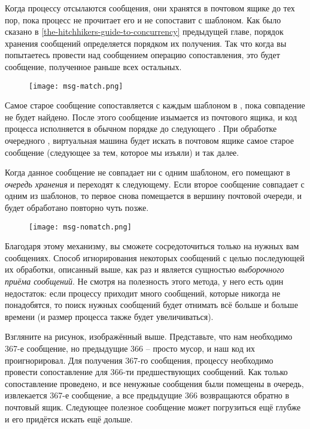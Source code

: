 Когда процессу отсылаются сообщения, они хранятся в почтовом ящике до тех пор, пока процесс не прочитает его и не сопоставит с шаблоном.
Как было сказано в \ref{the-hitchhikers-guide-to-concurrency} предыдущей главе, порядок хранения сообщений определяется  порядком их получения.
Так что когда вы попытаетесь провести над сообщением операцию сопоставления, это будет сообщение, полученное раньше всех остальных.
\begin{figure}[h!]
    \centering
    \texttt{[image: msg-match.png]}
\end{figure}

Самое старое сообщение сопоставляется с каждым шаблоном в , пока совпадение не будет найдено.
После этого сообщение изымается из почтового ящика, и код процесса исполняется в обычном порядке до следующего .
При обработке очередного , виртуальная машина будет искать в почтовом ящике самое старое сообщение (следующее за тем, которое мы изъяли) и так далее.

Когда данное сообщение не совпадает ни с одним шаблоном, его помещают в \emph{очередь хранения} и переходят к следующему.
Если второе сообщение совпадает с одним из шаблонов, то первое снова помещается в вершину почтовой очереди, и будет обработано повторно чуть позже.
\begin{figure}[h!]
    \centering
    \texttt{[image: msg-nomatch.png]}
\end{figure}

Благодаря этому механизму, вы сможете сосредоточиться только на нужных вам сообщениях.
Способ игнорирования некоторых сообщений с целью последующей их обработки, описанный выше, как раз и является сущностью \emph{выборочного приёма сообщений}.
Не смотря на полезность этого метода, у него есть один недостаток: если процессу приходит много сообщений, которые никогда не понадобятся, то поиск нужных сообщений будет отнимать всё больше и больше времени (и размер процесса также будет увеличиваться).

Взгляните на рисунок, изображённый выше.
Представьте, что нам необходимо 367\--е сообщение, но предыдущие 366 \--- просто мусор, и наш код их проигнорировал.
Для получения 367\--го сообщения, процессу необходимо провести сопоставление для 366\--ти предшествующих сообщений.
Как только сопоставление проведено, и все ненужные сообщения были помещены в очередь, извлекается 367\--е сообщение, а все предыдущие 366 возвращаются обратно в почтовый ящик.
Следующее полезное сообщение может погрузиться ещё глубже и его придётся искать ещё дольше.

